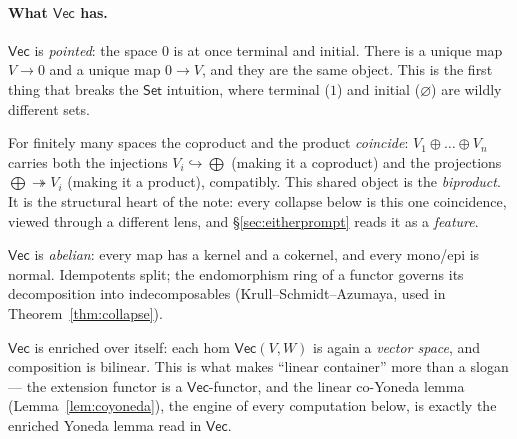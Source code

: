 \documentclass[11pt]{amsart}
\theoremstyle{plain}
\theoremstyle{definition}
\renewcommand{\Vec}{\mathsf{Vec}}
\newcommand{\Set}{\mathsf{Set}}
\begin{document}
\paragraph{What $\Vec$ has.}
\begin{description}[leftmargin=1.4em,style=nextline]
\item[A zero object.] $\Vec$ is \emph{pointed}: the space $0$ is at once terminal and
  initial. There is a unique map $V\to 0$ and a unique map $0\to V$, and they are the
  same object. This is the first thing that breaks the $\Set$ intuition, where
  terminal ($1$) and initial ($\varnothing$) are wildly different sets.
\item[Finite biproducts.] For finitely many spaces the coproduct and the product
  \emph{coincide}: $V_1\oplus\dots\oplus V_n$ carries both the injections
  $V_i\hookrightarrow\bigoplus$ (making it a coproduct) and the projections
  $\bigoplus\twoheadrightarrow V_i$ (making it a product), compatibly. This shared
  object is the \emph{biproduct}. It is the structural heart of the note: every
  collapse below is this one coincidence, viewed through a different lens, and
  \S\ref{sec:eitherprompt} reads it as a \emph{feature}.
\item[Kernels and cokernels.] $\Vec$ is \emph{abelian}: every map has a kernel and a
  cokernel, and every mono/epi is normal. Idempotents split; the endomorphism ring of
  a functor governs its decomposition into indecomposables
  (Krull--Schmidt--Azumaya, used in Theorem~\ref{thm:collapse}).
\item[Self-enrichment.] $\Vec$ is enriched over itself: each hom $\Vec(V,W)$ is again
  a \emph{vector space}, and composition is bilinear. This is what makes ``linear
  container'' more than a slogan --- the extension functor is a $\Vec$-functor, and
  the linear co-Yoneda lemma (Lemma~\ref{lem:coyoneda}), the engine of every
  computation below, is exactly the enriched Yoneda lemma read in $\Vec$.
\end{description}
\end{document}
